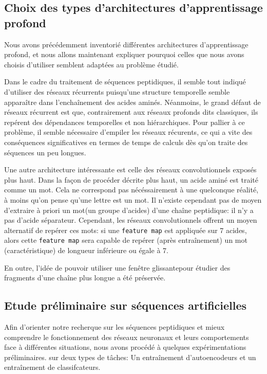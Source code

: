 \documentclass[a4paper, 11pt, onecolumn]{article}
\begin{document}
\subsection{Choix des types d'architectures d'apprentissage profond}

Nous avons précédemment inventorié différentes architectures d'apprentissage
profond, et nous allons maintenant expliquer pourquoi celles que nous avons
choisis d'utiliser semblent adaptées au problème étudié.

Dans le cadre du traitement de séquences peptidiques, il semble tout indiqué
d'utiliser des réseaux récurrents puisqu'une structure temporelle semble
apparaître dans l'enchaînement des acides aminés. Néanmoins, le grand défaut de
réseaux récurrent est que, contrairement aux réseaux profonds dits \og
classiques\fg, ils repérent des dépendances temporelles et non hiérarchiques.
Pour pallier à ce problème, il semble nécessaire d'empiler les réseaux
récurents, ce qui a vite des conséquences significatives en termes de temps de
calculs dès qu'on traite des séquences un peu longues.

Une autre architecture intéressante est celle des réseaux convolutionnels
exposés plus haut. Dans la façon de procéder décrite plus haut, un acide aminé
est traité comme un \og mot\fg. Cela ne correspond pas nécéssairement à une
quelconque réalité, à moins qu'on pense qu'une lettre est un mot. Il n'existe
cependant pas de moyen d'extraire à priori un \og mot\fg (un groupe d'acides)
d'une chaîne peptidique: il n'y a pas d'acide \og séparateur\fg. Cependant, les
réseaux convolutionnels offrent un moyen alternatif de repérer ces mots: si une
\texttt{feature map} est appliquée sur 7 acides, alors cette \texttt{feature
  map} sera capable de repérer (après entraînement) un mot (caractéristique) de
longueur inférieure ou égale à 7.

En outre, l'idée de pouvoir utiliser une \og fenêtre glissante\fg pour étudier
des fragments d'une chaîne plus longue a été préservée.

\subsection{Etude préliminaire sur séquences artificielles}

Afin d'orienter notre recherque sur les séquences peptidiques et mieux comprendre le fonctionnement des réseaux neuronaux et leurs
comportements face à différentes situations, nous avons procédé à quelques
expérimentations préliminaires. sur deux types de tâches: Un entraînement
d'autoencodeurs et un entraînement de classifcateurs.
\end{document}
